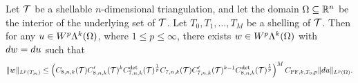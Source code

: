 \documentclass[10pt,a4paper]{article}
\begin{document}
\begin{theorem}\label{theorem:poincarefriedrichsestimate:exterior:contraction}
	Let ${\mathcal T}$ be a shellable $n$-dimensional triangulation, and let the domain $\Omega \subseteq {\mathbb R}^{n}$ be the interior of the underlying set of ${\mathcal T}$.
    Let $T_0, T_1, \dots, T_M$ be a shelling of ${\mathcal T}$.
    Then for any $u \in W^{p}\Lambda^{k}(\Omega)$, where $1 \leq p \leq \infty$, 
    there exists $w \in W^{p}\Lambda^{k}(\Omega)$ with $d w = d u$ 
    such that 
    \begin{align*}
        \| w \|_{L^{p}(T_{m})}
        \leq 
        \left( 
        C_{8,n,k}({\mathcal T})
        C'_{8,n,k}({\mathcal T})^{k} 
        C^{\det}_{7,n,k}({\mathcal T})^{\frac 1 p} 
        C_{7,n,k}({\mathcal T})
        C'_{7,n,k}({\mathcal T})^{k-1} 
        C^{\det}_{8,n,k}({\mathcal T})^{\frac 1 p} 
        \right)^{M}
        C_{{{\rm PF}},k,T_{0},p}
        \| d u \|_{L^{p}(\Omega)}
        .
    \end{align*}
\end{theorem}
\end{document}
